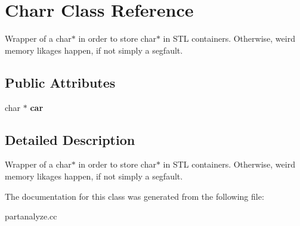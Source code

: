 \section{Charr Class Reference}
\label{classCharr}
Wrapper of a char$\ast$ in order to store char$\ast$ in STL containers. Otherwise, weird memory likages happen, if not simply a segfault.  


\subsection*{Public Attributes}
\begin{CompactItemize}
\item 
char $\ast$ {\bf car}\label{classCharr_o0}

\end{CompactItemize}


\subsection{Detailed Description}
Wrapper of a char$\ast$ in order to store char$\ast$ in STL containers. Otherwise, weird memory likages happen, if not simply a segfault. 



The documentation for this class was generated from the following file:\begin{CompactItemize}
\item 
partanalyze.cc\end{CompactItemize}
